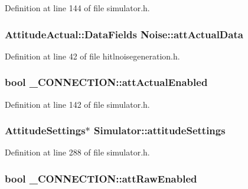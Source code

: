 \-Definition at line 144 of file simulator.\-h.

\hypertarget{group___h_i_t_l_plugin_ga689a709ae944673ff6edd54ab6ca4d7d}{
\subsubsection[{att\-Actual\-Data}]{\setlength{\rightskip}{0pt plus 5cm}\-Attitude\-Actual\-::\-Data\-Fields {\bf \-Noise\-::att\-Actual\-Data}}}\label{group___h_i_t_l_plugin_ga689a709ae944673ff6edd54ab6ca4d7d}


\-Definition at line 42 of file hitlnoisegeneration.\-h.

\hypertarget{group___h_i_t_l_plugin_ga9b02793b3d0effcdb43df1d5e20012fd}{
\subsubsection[{att\-Actual\-Enabled}]{\setlength{\rightskip}{0pt plus 5cm}bool {\bf \-\_\-\-C\-O\-N\-N\-E\-C\-T\-I\-O\-N\-::att\-Actual\-Enabled}}}\label{group___h_i_t_l_plugin_ga9b02793b3d0effcdb43df1d5e20012fd}


\-Definition at line 142 of file simulator.\-h.

\hypertarget{group___h_i_t_l_plugin_ga4430b724d2151ce662d6b82a3b8ba74a}{
\subsubsection[{attitude\-Settings}]{\setlength{\rightskip}{0pt plus 5cm}\-Attitude\-Settings$\ast$ {\bf \-Simulator\-::attitude\-Settings}}}\label{group___h_i_t_l_plugin_ga4430b724d2151ce662d6b82a3b8ba74a}


\-Definition at line 288 of file simulator.\-h.

\hypertarget{group___h_i_t_l_plugin_ga003958320fd5c963c5d2ddff60ffd28b}{
\subsubsection[{att\-Raw\-Enabled}]{\setlength{\rightskip}{0pt plus 5cm}bool {\bf \-\_\-\-C\-O\-N\-N\-E\-C\-T\-I\-O\-N\-::att\-Raw\-Enabled}}}\label{group___h_i_t_l_plugin_ga003958320fd5c963c5d2ddff60ffd28b}


